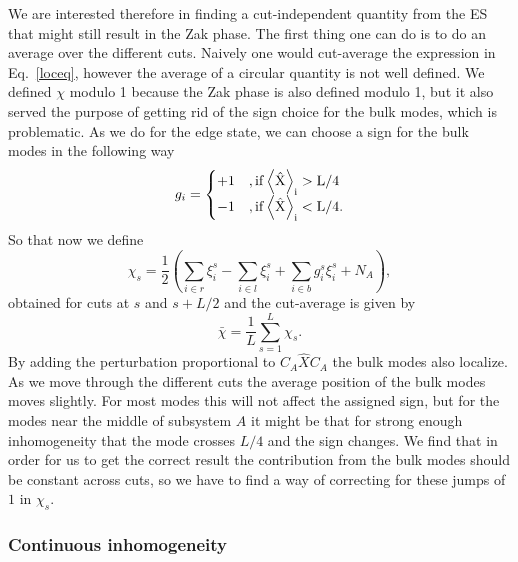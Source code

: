 \documentclass[twocolumn,amsmath,longbibliography,amssymb,superscriptaddress]{revtex4-1}
\begin{document}
We are interested therefore in finding a cut-independent quantity from the ES that might still result in the Zak phase. The first thing one can do is to do an average over the different cuts. Naively one would cut-average the expression in Eq.~\eqref{loceq}, however the average of a circular quantity is not well defined. We defined $\chi$ modulo 1 because the Zak phase is also defined modulo 1, but it also served the purpose of getting rid of the sign choice for the bulk modes, which is problematic. As we do for the edge state, we can choose a sign for the bulk modes in the following way
\begin{equation}
g_i=
\begin{cases}
 +1 &,\rm{if} \expval{\hat{X}}_i > L/4  \\
 -1 &,\rm{if} \expval{\hat{X}}_i < L/4.
\end{cases}
\end{equation}
So that now we define
\begin{equation}
\chi_s = \frac{1}{2} \left( \sum_{i\in r}\xi^s_i-\sum_{i\in l}\xi^s_i + \sum_{i\in b}g_i^s \xi^s_i  + N_A \right),
\end{equation}
obtained for cuts at $s$ and $s+L/2$ and the cut-average is given by
\begin{equation}
\bar{\chi} = \frac{1}{L}\sum_{s=1}^L \chi_s.
\label{batcutavg}
\end{equation}
By adding the perturbation proportional to $C_A\hat{X} C_A$ the bulk modes also localize. As we move through the different cuts the average position of the bulk modes moves slightly. For most modes this will not affect the assigned sign, but for the modes near the middle of subsystem $A$ it might be that for strong enough inhomogeneity that the mode crosses $L/4$ and the sign changes. We find that in order for us to get the correct result the contribution from the bulk modes should be constant across cuts, so we have to find a way of correcting for these jumps of $1$ in $\chi_s$. 

\subsubsection{Continuous inhomogeneity}
\end{document}
